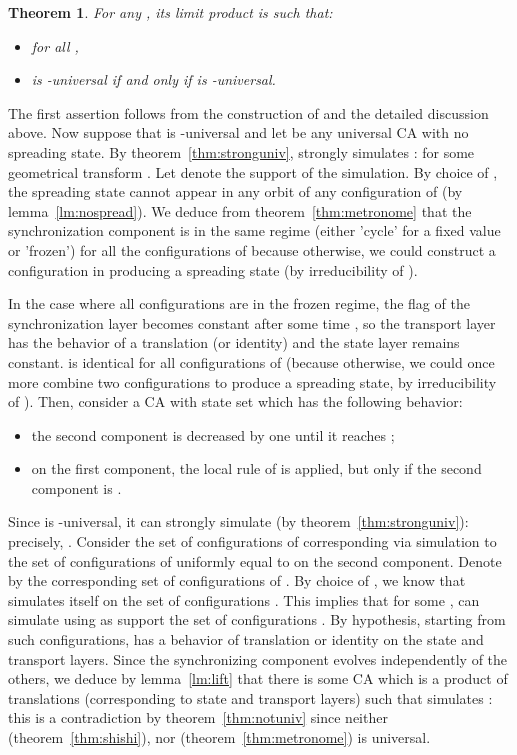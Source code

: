 \documentclass[a4paper]{elsarticle}
\newtheorem{thm}{Theorem}[section]
\begin{document}
\begin{thm}
  \label{thm:limprod}
  For any , its limit product  is such that:
  \begin{itemize}
  \item  for all ,
  \item  is -universal if and only if
     is -universal.
  \end{itemize}
\end{thm}
\begin{pf}
  The first assertion follows from the construction of  and the
  detailed discussion above. Now suppose that  is
  -universal and let  be any universal CA with no spreading
  state. By theorem~\ref{thm:stronguniv},  strongly simulates
  :  for some geometrical
  transform . Let  denote the support of the simulation. By choice of
  , the spreading state  cannot appear in any orbit of any
  configuration of  (by lemma~\ref{lm:nospread}). We deduce from
  theorem~\ref{thm:metronome} that the synchronization component is in the same
  regime (either 'cycle' for a fixed value  or 'frozen') for all the
  configurations of  because otherwise, we could construct a configuration in
   producing a spreading state (by irreducibility of ).

  In the case where all configurations are in the frozen regime, the
  flag of the synchronization layer becomes constant after some time
  , so the transport layer has the behavior of a translation (or
  identity) and the state layer remains constant.  is identical
  for all configurations of  (because otherwise, we could once more
  combine two configurations to produce a spreading state, by
  irreducibility of ). Then, consider a CA  with state set
   which has the following
  behavior:
  \begin{itemize}
  \item the second component is decreased by one until it reaches ;
  \item on the first component, the local rule of  is applied,
    but only if the second component is .
  \end{itemize}
  Since  is -universal, it can strongly simulate
   (by theorem~\ref{thm:stronguniv}): precisely,
  . Consider the set  of
  configurations of  corresponding via simulation to the set of
  configurations of  uniformly equal to  on the second
  component. Denote by  the corresponding set of
  configurations of . By choice of , we know
  that  simulates itself on the set of configurations
  . This implies that for some ,  can simulate  using as support the set
  of configurations . By hypothesis,
  starting from such configurations,  has a behavior
  of translation or identity on the state and transport layers. Since
  the synchronizing component evolves independently of the others, we
  deduce by lemma~\ref{lm:lift} that there is some CA  which is
  a product of translations (corresponding to state and transport
  layers) such that  simulates : this is a
  contradiction by theorem~\ref{thm:notuniv} since neither 
  (theorem~\ref{thm:shishi}), nor 
  (theorem~\ref{thm:metronome}) is universal.


\end{pf}
\end{document}
